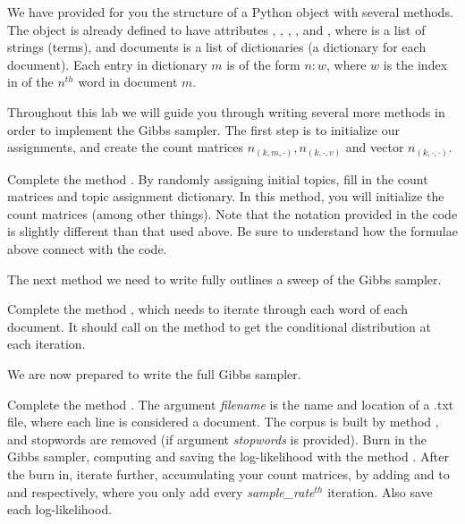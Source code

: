 We have provided for you the structure of a Python object  with several methods. The object is already defined to have attributes , , , , and , where  is a list of strings (terms), and documents is a list of dictionaries (a dictionary for each document). Each entry in dictionary $m$ is of the form $n : w$, where $w$ is the index in  of the $n^{th}$ word in document $m$.

Throughout this lab we will guide you through writing several more methods in order to implement the Gibbs sampler. The first step is to initialize our assignments, and create the count matrices $n_{(k,m,\cdot)}, n_{(k,\cdot,v)}$ and vector $n_{(k,\cdot,\cdot)}$.

\begin{problem}
Complete the method . By randomly assigning initial topics, fill in the count matrices and topic assignment dictionary. In this method, you will initialize the count matrices (among other things). Note that the notation
provided in the code is slightly different than that used above. Be sure to understand how the formulae above
connect with the code.
\end{problem}

The next method we need to write fully outlines a sweep of the Gibbs sampler.

\begin{problem}
Complete the method , which needs to iterate through each word of each document. It should call on the method  to get the conditional distribution at each iteration.
\end{problem}

We are now prepared to write the full Gibbs sampler.

\begin{problem}
Complete the method . The argument \emph{filename} is the name and location of a .txt file, where each line is considered a document. The corpus is built by method , and stopwords are removed (if argument \emph{stopwords} is provided). Burn in the Gibbs sampler, computing and saving the log-likelihood with the method . After the burn in, iterate further, accumulating your count matrices, by adding  and  to  and  respectively, where you only add every \emph{sample\_rate}$^{th}$ iteration. Also save each log-likelihood.
\end{problem}

